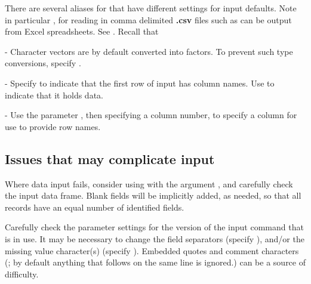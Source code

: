 There are several aliases for  that have different
settings for input defaults. Note in particular ,
for reading in comma delimited {\bf .csv} files such as can be output
from Excel spreadsheets.  See . Recall that


\begin{itemizz}
\item[-] Character vectors are by default converted into factors.  To
  prevent such type conversions, specify
  .

\item[-] Specify  to indicate that the first row
  of input has column names. Use 
  to indicate that it holds data.\newline {}

\item[-] Use the parameter , then specifying a column
number, to specify a column for use to provide row names.
\end{itemizz}

\subsection*{Issues that may complicate input}

Where data input fails, consider using  with the
argument , and carefully check the input data frame.
Blank fields will be implicitly added, as needed, so that all records
have an equal number of identified fields.

Carefully check the parameter settings for the
version of the input command that is in use.  It may be necessary to
change the field separators (specify ), and/or the missing
value character(s) (specify ). Embedded quotes and
comment characters (\code{\#}; by default anything that follows
\code{\#} on the same line is ignored.) can be a source of difficulty.

